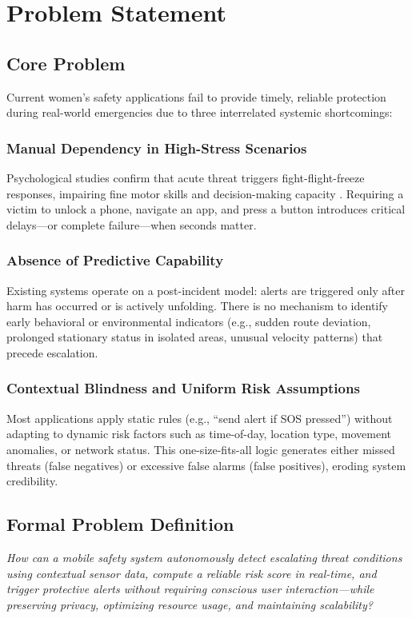\section{Problem Statement}

\subsection{Core Problem}
Current women's safety applications fail to provide timely, reliable protection during real-world emergencies due to three interrelated systemic shortcomings:

\subsubsection{Manual Dependency in High-Stress Scenarios}
Psychological studies confirm that acute threat triggers fight-flight-freeze responses, impairing fine motor skills and decision-making capacity \cite{nij2022}. Requiring a victim to unlock a phone, navigate an app, and press a button introduces critical delays---or complete failure---when seconds matter.

\subsubsection{Absence of Predictive Capability}
Existing systems operate on a post-incident model: alerts are triggered only after harm has occurred or is actively unfolding. There is no mechanism to identify early behavioral or environmental indicators (e.g., sudden route deviation, prolonged stationary status in isolated areas, unusual velocity patterns) that precede escalation.

\subsubsection{Contextual Blindness and Uniform Risk Assumptions}
Most applications apply static rules (e.g., ``send alert if SOS pressed'') without adapting to dynamic risk factors such as time-of-day, location type, movement anomalies, or network status. This one-size-fits-all logic generates either missed threats (false negatives) or excessive false alarms (false positives), eroding system credibility.

\subsection{Formal Problem Definition}
\textit{How can a mobile safety system autonomously detect escalating threat conditions using contextual sensor data, compute a reliable risk score in real-time, and trigger protective alerts without requiring conscious user interaction---while preserving privacy, optimizing resource usage, and maintaining scalability?}

